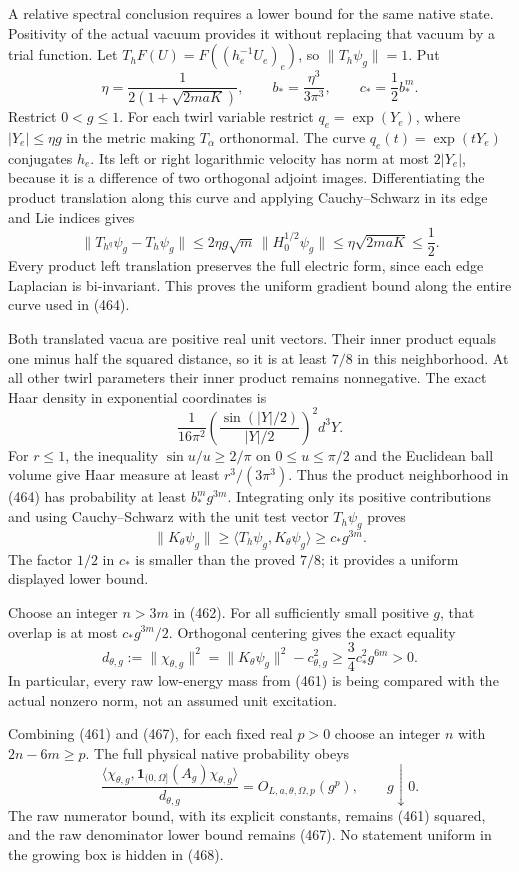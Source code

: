 \documentclass[
  11pt,
]{article}
\begin{document}
A relative spectral conclusion requires a lower bound for the same
native state. Positivity of the actual vacuum provides it without
replacing that vacuum by a trial function. Let
\(T_hF(U)=F((h_e^{-1}U_e)_e)\), so \(\|T_h\psi_g\|=1\). Put \[
 \eta=\frac1{2(1+\sqrt{2maK})},\qquad
 b_*=\frac{\eta^3}{3\pi^3},\qquad c_*=\frac12 b_*^m .
 \tag{463}
\] Restrict \(0<g\le1\). For each twirl variable restrict
\(q_e=\exp(Y_e)\), where \(|Y_e|\le\eta g\) in the metric making
\(T_\alpha\) orthonormal. The curve \(q_e(t)=\exp(tY_e)\) conjugates
\(h_e\). Its left or right logarithmic velocity has norm at most
\(2|Y_e|\), because it is a difference of two orthogonal adjoint images.
Differentiating the product translation along this curve and applying
Cauchy--Schwarz in its edge and Lie indices gives \[
 \|T_{h^q}\psi_g-T_h\psi_g\|
 \le2\eta g\sqrt m\,\|H_0^{1/2}\psi_g\|
 \le\eta\sqrt{2maK}\le\frac12 .
 \tag{464}
\] Every product left translation preserves the full electric form,
since each edge Laplacian is bi-invariant. This proves the uniform
gradient bound along the entire curve used in (464).

Both translated vacua are positive real unit vectors. Their inner
product equals one minus half the squared distance, so it is at least
\(7/8\) in this neighborhood. At all other twirl parameters their inner
product remains nonnegative. The exact Haar density in exponential
coordinates is \[
 \frac1{16\pi^2}
       \left(\frac{\sin(|Y|/2)}{|Y|/2}\right)^2d^3Y.
 \tag{465}
\] For \(r\le1\), the inequality \(\sin u/u\ge2/\pi\) on
\(0\le u\le\pi/2\) and the Euclidean ball volume give Haar measure at
least \(r^3/(3\pi^3)\). Thus the product neighborhood in (464) has
probability at least \(b_*^m g^{3m}\). Integrating only its positive
contributions and using Cauchy--Schwarz with the unit test vector
\(T_h\psi_g\) proves \[
 \boxed{\|K_\theta\psi_g\|
 \ge \langle T_h\psi_g,K_\theta\psi_g\rangle
 \ge c_*g^{3m}.}
 \tag{466}
\] The factor \(1/2\) in \(c_*\) is smaller than the proved \(7/8\); it
provides a uniform displayed lower bound.

Choose an integer \(n>3m\) in (462). For all sufficiently small positive
\(g\), that overlap is at most \(c_*g^{3m}/2\). Orthogonal centering
gives the exact equality \[
 d_{\theta,g}:=\|\chi_{\theta,g}\|^2
       =\|K_\theta\psi_g\|^2-c_{\theta,g}^2
       \ge\frac34c_*^2g^{6m}>0.
 \tag{467}
\] In particular, every raw low-energy mass from (461) is being compared
with the actual nonzero norm, not an assumed unit excitation.

Combining (461) and (467), for each fixed real \(p>0\) choose an integer
\(n\) with \(2n-6m\ge p\). The full physical native probability obeys \[
 \boxed{
 \frac{\langle\chi_{\theta,g},
      \mathbf1_{(0,\Omega]}(A_g)\chi_{\theta,g}\rangle}
      {d_{\theta,g}}
       =O_{L,a,\theta,\Omega,p}(g^p),\qquad g\downarrow0 .}
 \tag{468}
\] The raw numerator bound, with its explicit constants, remains (461)
squared, and the raw denominator lower bound remains (467). No statement
uniform in the growing box is hidden in (468).
\end{document}
